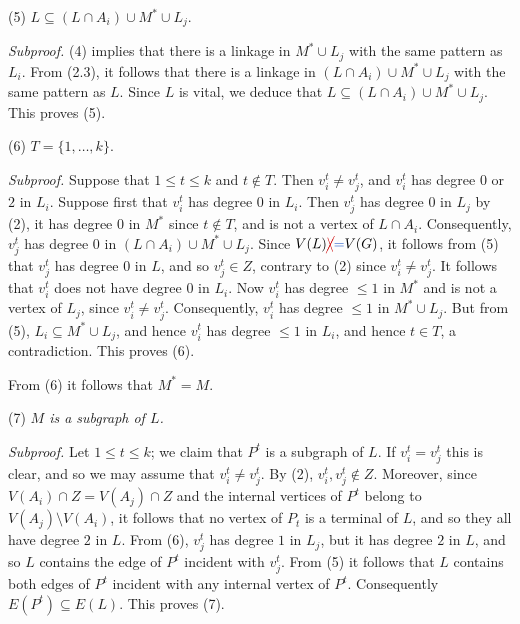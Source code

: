 \hspace*{12pt}(5) $L \subseteq (L \cap A_i) \cup M^* \cup L_j$.

\textit{Subproof.} (4) implies that there is a linkage in $M^* \cup L_j$ with the same pattern as $L_i$. From (2.3), it follows that there is a linkage in $(L \cap A_i) \cup M^* \cup L_j$ with the same pattern as $L$. Since $L$ is vital, we deduce that $L \subseteq (L \cap A_i) \cup M^* \cup L_j$. This proves (5).

\hspace*{12pt}(6) $T = \{1, \dots, k\}$.

\textit{Subproof.} Suppose that $1 \le t \le k$ and $t \notin T$. Then $v_i^t \ne v_j^t$, and $v_i^t$ has degree $0$ or $2$ in $L_i$. Suppose first that $v_i^t$ has degree $0$ in $L_i$. Then $v_j^t$ has degree $0$ in $L_j$ by (2), it has degree $0$ in $M^*$ since $t \notin T$, and is not a vertex of $L \cap A_i$. Consequently, $v_j^t$ has degree $0$ in $(L \cap A_i) \cup M^* \cup L_j$. Since $V(L) \delm{\setminus}\fix{=} V(G)$, it follows from (5) that $v_j^t$ has degree $0$ in $L$, and so $v_j^t \in Z$, contrary to (2) since $v_i^t \ne v_j^t$. It follows that $v_i^t$ does not have degree $0$ in $L_i$. Now $v_i^t$ has degree $\le 1$ in $M^*$ and is not a vertex of $L_j$, since $v_i^t \ne v_j^t$. Consequently, $v_i^t$ has degree $\le 1$ in $M^* \cup L_j$. But from (5), $L_i \subseteq M^* \cup L_j$, and hence $v_i^t$ has degree $\le 1$ in $L_i$, and hence $t \in T$, a contradiction. This proves (6).

From (6) it follows that $M^* = M$.

\hspace*{12pt}(7) \textit{$M$ is a subgraph of $L$.}

\textit{Subproof.} Let $1 \le t \le k$; we claim that $P^t$ is a subgraph of $L$. If $v_i^t = v_j^t$ this is clear, and so we may assume that $v_i^t \ne v_j^t$. By (2), $v_i^t, v_j^t \notin Z$. Moreover, since $V(A_i) \cap Z = V(A_j) \cap Z$ and the internal vertices of $P^t$ belong to $V(A_j) \setminus V(A_i)$, it follows that no vertex of $P_t$ is a terminal of $L$, and so they all have degree $2$ in $L$. From (6), $v_j^t$ has degree $1$ in $L_j$, but it has degree $2$ in $L$, and so $L$ contains the edge of $P^t$ incident with $v_j^t$. From (5) it follows that $L$ contains both edges of $P^t$ incident with any internal vertex of $P^t$. Consequently $E(P^t) \subseteq E(L)$. This proves (7).


